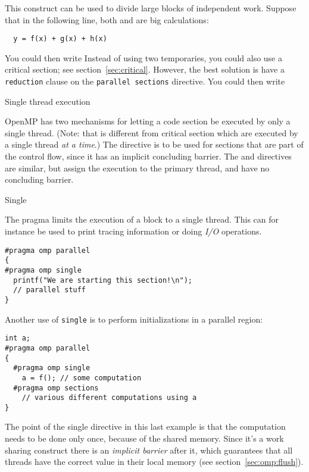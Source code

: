 This construct can be used to divide large blocks of independent work.
Suppose that in the following line, both  and 
are big calculations:
\begin{lstlisting}
  y = f(x) + g(x) + h(x)
\end{lstlisting}
You could then write
Instead of using two temporaries, you could also use a critical
section; see section~\ref{sec:critical}.  However, the best solution
is have a \lstinline{reduction} clause on the \lstinline{parallel sections} directive.
You could then write

 {Single thread execution}
\label{sec:omp-single}

OpenMP has two mechanisms for letting a code section be executed by only
a single thread.
(Note: that is different from critical section which are executed by a single
thread \textsl{at a time}.)
The  directive is to be used for sections
that are part of the control flow, since it has an implicit concluding barrier.
The  and  directives are similar,
but assign the execution to the primary thread, and have no concluding barrier.

 {Single}

The  pragma
limits the execution of a block to a single thread. 
This can for instance be used to print tracing information
or doing \emph{I/O} operations.
\begin{lstlisting}
#pragma omp parallel
{
#pragma omp single
  printf("We are starting this section!\n");
  // parallel stuff
}
\end{lstlisting}
Another use of \lstinline{single} is to perform initializations
in a parallel region:
\begin{lstlisting}
int a;
#pragma omp parallel
{
  #pragma omp single
    a = f(); // some computation
  #pragma omp sections
    // various different computations using a
}
\end{lstlisting}

The point of the single directive in this last example is that the
computation needs to be done only once, because of the shared memory.
Since it's a work sharing construct there is an \emph{implicit
  barrier} after it,
which guarantees that all threads have the correct value in their
local memory (see section~\ref{sec:omp:flush}).

